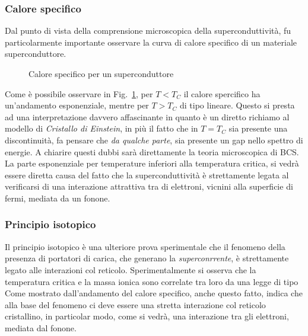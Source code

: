 \subsubsection{Calore specifico}
Dal punto di vista della comprensione microscopica della superconduttivit\`a, fu particolarmente importante osservare la curva di calore specifico di un materiale superconduttore.
\begin{figure}
	\centering
	\caption{Calore specifico per un superconduttore}
	\label{SUPER:CAL:SP}
\end{figure}
Come \`e possibile osservare in Fig.~\ref{SUPER:CAL:SP}, per $T<T_C$ il calore spercifico ha un'andamento esponenziale, mentre per $T>T_C$ di tipo lineare. Questo si presta ad una interpretazione davvero affascinante in quanto \`e un diretto richiamo al modello di \textit{Cristallo di Einstein}, in pi\`u il fatto che in $T=T_C$ sia presente una discontinuit\`a, fa pensare che \textit{da qualche parte}, sia presente un gap nello spettro di energie. A chiarire questi dubbi sar\`a direttamente la teoria microscopica di BCS. La parte esponenziale per temperature inferiori alla temperatura critica, si vedr\`a essere diretta causa del fatto che la superconduttivit\`a \`e strettamente legata al verificarsi di una interazione attrattiva tra di elettroni, vicnini alla superficie di fermi, mediata da un fonone.

\subsubsection{Principio isotopico}
Il principio isotopico \`e una ulteriore prova sperimentale che il fenomeno della presenza di portatori di carica, che generano la \textit{superconrrente}, \`e strettamente legato alle interazioni col reticolo. Sperimentalmente si osserva che la temperatura critica e la massa ionica sono correlate tra loro da una legge di tipo
Come mostrato dall'andamento del calore specifico, anche questo fatto, indica che alla base del fenomeno ci deve essere una stretta interazione col reticolo cristallino, in particolar modo, come si vedr\`a, una interazione tra gli elettroni, mediata dal fonone.

